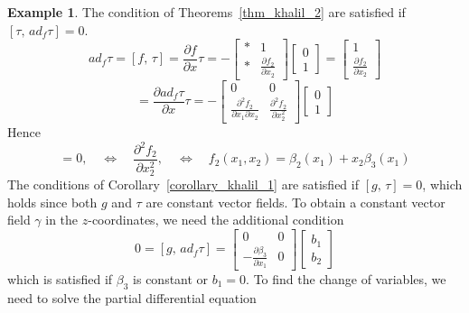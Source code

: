 \documentclass[11pt,a4paper,oneside]{book}
\numberwithin{equation}{section}
\theoremstyle{it}
\theoremstyle{definition}
\newtheorem{example}{Example}[section]
\begin{document}
\begin{example}
	The condition of Theorems~\ref{thm_khalil_2} are satisfied if $[\tau,\,ad_f\tau]=0$.
	\begin{equation*}
		ad_f\tau=[f,\,\tau]= \frac{\partial f}{\partial x}\tau=-\begin{bmatrix} * & 1 \\[6pt] * & \frac{\partial f_2}{\partial x_2} \end{bmatrix}\begin{bmatrix} 0 \\[6pt] 1 \end{bmatrix} = \begin{bmatrix} 1 \\[6pt] \frac{\partial f_2}{\partial x_2} \end{bmatrix}
	\end{equation*}
	\begin{equation*}
		[\tau,\,ad_f\tau]=\frac{\partial ad_f\tau}{\partial x}\tau	= -\begin{bmatrix} 0 & 0 \\[6pt] \frac{\partial^2 f_2}{\partial x_1\partial x_2} & \frac{\partial^2 f_2}{\partial x_2^2} \end{bmatrix}	\begin{bmatrix} 0 \\[6pt] 1 \end{bmatrix}
	\end{equation*}
	Hence
	\begin{equation*}
		[\tau,\,ad_f\tau]=0,\quad\Leftrightarrow\quad\frac{\partial^2 f_2}{\partial x_2^2},\quad\Leftrightarrow\quad f_2(x_1,x_2)=\beta_2(x_1)+x_2\beta_3(x_1)
	\end{equation*}
	The conditions of Corollary~\ref{corollary_khalil_1} are satisfied if $[g,\,\tau]=0$, which holds since both $g$ and $\tau$ are constant vector fields. To obtain a constant vector field $\gamma$ in the $z$-coordinates, we need the additional condition
	\begin{equation*}
		0=[g,\,ad_f\tau]=\begin{bmatrix} 0 & 0 \\[6pt] -\frac{\partial \beta_3}{\partial x_1} & 0 \end{bmatrix}\begin{bmatrix} b_1 \\[6pt] b_2 \end{bmatrix}
	\end{equation*}
	which is satisfied if $\beta_3$ is constant or $b_1=0$. To find the change of variables, we need to solve the partial differential equation
	\begin{equation*}

\end{equation*}
\end{example}
\end{document}

